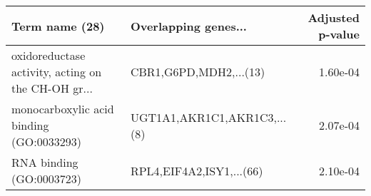 \begin{tabular}{llr}
\toprule
                                    Term name (28) &        Overlapping genes... &  Adjusted p-value \\
\midrule
oxidoreductase activity, acting on the CH-OH gr... &      CBR1,G6PD,MDH2,...(13) &          1.60e-04 \\
          monocarboxylic acid binding (GO:0033293) & UGT1A1,AKR1C1,AKR1C3,...(8) &          2.07e-04 \\
                          RNA binding (GO:0003723) &    RPL4,EIF4A2,ISY1,...(66) &          2.10e-04 \\
\bottomrule
\end{tabular}
